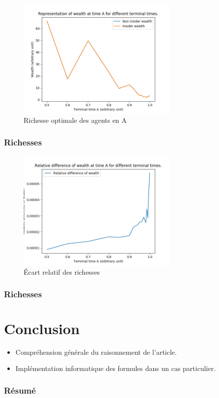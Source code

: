 \documentclass[french]{beamer}
\begin{document}
\begin{frame}
\begin{figure}[H]
  \centering
    \includegraphics[width=0.7\textwidth]{images/wealths.png}
  \caption{Richesse optimale des agents en A}
\end{figure} 
\frametitle{Richesses}
\end{frame}

\begin{frame}
\begin{figure}[H]
  \centering
    \includegraphics[width=0.7\textwidth]{images/relative_difference.png}
  \caption{Écart relatif des richesses}
\end{figure} 
\frametitle{Richesses}
\end{frame}

\section{Conclusion}
\begin{frame}
\begin{itemize}
	\item Compréhension générale du raisonnement de l'article.
	\item Implémentation informatique des formules dans un cas particulier.
\end{itemize}
\frametitle{Résumé}
\end{frame}
\end{document}
